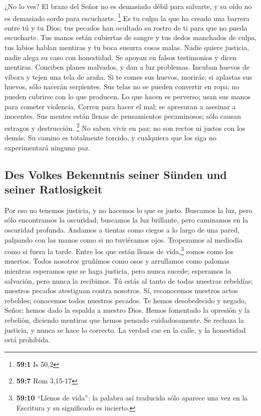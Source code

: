  ¿No lo ves? El brazo del Señor no es demasiado débil para
salvarte, y su oído no es demasiado sordo para escucharte. \footnote{\textbf{59:1}
  Is 50,2}  Es tu culpa la que ha creado una barrera entre
tú y tu Dios; tus pecados han ocultado su rostro de ti para que no pueda
escucharte.  Tus manos están cubiertas de sangre y tus
dedos manchados de culpa, tus labios hablan mentiras y tu boca susurra
cosas malas.  Nadie quiere justicia, nadie alega su caso
con honestidad. Se apoyan en falsos testimonios y dicen mentiras.
Conciben planes malvados, y dan a luz problemas.  Incuban
huevos de víbora y tejen una tela de araña. Si te comes sus huevos,
morirás; si aplastas sus huevos, sólo nacerán serpientes. 
Sus telas no se pueden convertir en ropa; no pueden cubrirse con lo que
producen. Lo que hacen es perverso; usan sus manos para cometer
violencia.  Corren para hacer el mal; se apresuran a
asesinar a inocentes. Sus mentes están llenas de pensamientos
pecaminosos; sólo causan estragos y destrucción. \footnote{\textbf{59:7}
  Rom 3,15-17}  No saben vivir en paz; no son rectos ni
justos con los demás. Su camino es totalmente torcido, y cualquiera que
los siga no experimentará ninguna paz.

\hypertarget{des-volkes-bekenntnis-seiner-suxfcnden-und-seiner-ratlosigkeit}{%
\subsection{Des Volkes Bekenntnis seiner Sünden und seiner
Ratlosigkeit}\label{des-volkes-bekenntnis-seiner-suxfcnden-und-seiner-ratlosigkeit}}

 Por eso no tenemos justicia, y no hacemos lo que es
justo. Buscamos la luz, pero sólo encontramos la oscuridad; buscamos la
luz brillante, pero caminamos en la oscuridad profunda. 
Andamos a tientas como ciegos a lo largo de una pared, palpando con las
manos como si no tuviéramos ojos. Tropezamos al mediodía como si fuera
la tarde. Entre los que están llenos de vida,\footnote{\textbf{59:10}
  ``Llenos de vida'': la palabra así traducida sólo aparece una vez en
  la Escritura y su significado es incierto.} somos como los muertos.
 Todos nosotros gruñimos como osos y arrullamos como
palomas mientras esperamos que se haga justicia, pero nunca sucede;
esperamos la salvación, pero nunca la recibimos.  Tú
estás al tanto de todas nuestras rebeldías; nuestros pecados atestiguan
contra nosotros. Sí, reconocemos nuestros actos rebeldes; conocemos
todos nuestros pecados.  Te hemos desobedecido y negado,
Señor; hemos dado la espalda a nuestro Dios. Hemos fomentado la opresión
y la rebelión, diciendo mentiras que hemos pensado cuidadosamente.
 Se rechaza la justicia, y nunca se hace lo correcto. La
verdad cae en la calle, y la honestidad está prohibida.

